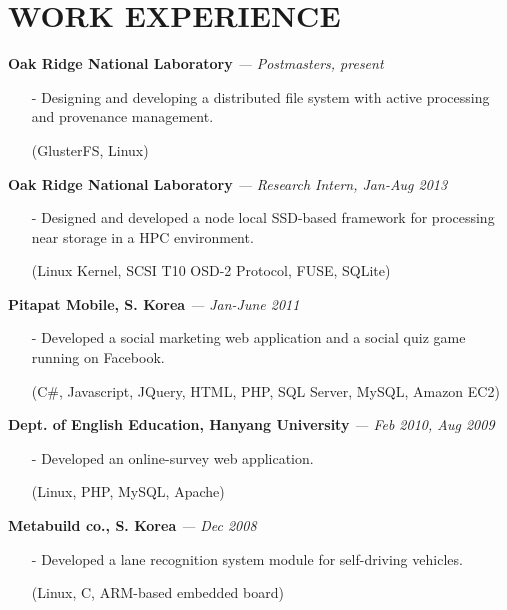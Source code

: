 \section{WORK EXPERIENCE} 
\vspace{0.03in} 
{\bf Oak Ridge National Laboratory}
{\it \footnotesize --- Postmasters, present}
\begin{itemize}[leftmargin=*]
\setlength\itemsep{-0.02in}
 \item[-] Designing and developing a distributed file system with
	  active processing and provenance management.
 \item[] {\small(GlusterFS, Linux)}
\end{itemize}
\vspace{-0.15in}

{\bf Oak Ridge National Laboratory}
{\it \footnotesize --- Research Intern, Jan-Aug 2013}
\begin{itemize}[leftmargin=*]
\setlength\itemsep{-0.02in}
 \item[-] Designed and developed a node local SSD-based framework for processing near
  storage in a HPC environment.
 \item[] {\small(Linux Kernel, SCSI T10 OSD-2 Protocol, FUSE, SQLite)}
\end{itemize}
\vspace{-0.15in}
{\bf Pitapat Mobile, S. Korea}
{\it \footnotesize --- Jan-June 2011}
\begin{itemize}[leftmargin=*]
\setlength\itemsep{-0.02in}
 \item[-] Developed a social marketing web application and a social quiz game running on
  Facebook.
 \item[] {\small(C\#, Javascript, JQuery, HTML, PHP, SQL Server, MySQL, Amazon EC2)}
\end{itemize}
\vspace{-0.15in}

{\bf Dept. of English Education, Hanyang University}
{\it \footnotesize --- Feb 2010, Aug 2009}
\begin{itemize}[leftmargin=*]
\setlength\itemsep{-0.02in}
 \item[-] Developed an online-survey web application.
 \item[] {\small(Linux, PHP, MySQL, Apache)}
\end{itemize}
\vspace{-0.15in}

{\bf Metabuild co., S. Korea}
{\it \footnotesize --- Dec 2008}
\begin{itemize}[leftmargin=*]
\setlength\itemsep{-0.02in}
 \item[-] Developed a lane recognition system module for self-driving vehicles.
 \item[] {\small(Linux, C, ARM-based embedded board)}
\end{itemize}

